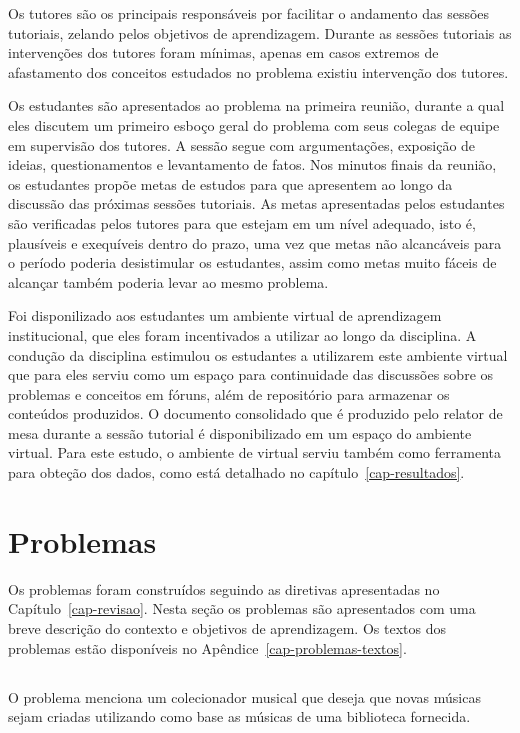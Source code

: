 Os tutores são os principais responsáveis por facilitar o andamento
das sessões tutoriais, zelando pelos objetivos de aprendizagem.
Durante as sessões tutoriais as intervenções dos tutores
foram mínimas, apenas em casos extremos de
afastamento dos conceitos estudados no problema existiu intervenção dos tutores.

Os estudantes são apresentados ao problema na primeira reunião, durante
a qual eles discutem um primeiro esboço geral do problema com seus
colegas de equipe em supervisão dos tutores.
A sessão segue com argumentações, exposição de ideias,
questionamentos e levantamento de fatos.
Nos minutos finais da reunião, os estudantes propõe metas de estudos para
que apresentem ao longo da discussão das próximas sessões tutoriais.
As metas apresentadas pelos estudantes são verificadas pelos tutores
para que estejam em um nível adequado, isto é, plausíveis e exequíveis
dentro do prazo, uma vez que metas não
alcancáveis para o período poderia desistimular os estudantes, assim
como metas muito fáceis de alcançar também poderia levar
ao mesmo problema.

Foi disponilizado aos estudantes um ambiente virtual de aprendizagem
institucional, que eles foram incentivados a utilizar ao longo
da disciplina.
A condução da disciplina estimulou os estudantes a
utilizarem este ambiente virtual que para eles serviu como um
espaço para continuidade das discussões sobre os problemas
e conceitos em fóruns, além de repositório para armazenar
os conteúdos produzidos.
O documento consolidado que é produzido pelo relator de mesa
durante a sessão tutorial é disponibilizado em um espaço
do ambiente virtual.
Para este estudo, o ambiente de virtual serviu
também como ferramenta para obteção dos dados,
como está detalhado no
capítulo~\ref{cap-resultados}.

\section{Problemas}
Os problemas foram construídos seguindo as diretivas
apresentadas no Capítulo~\ref{cap-revisao}.
Nesta seção os problemas são apresentados com uma breve
descrição do contexto e objetivos de aprendizagem.
Os textos dos problemas estão disponíveis no
Apêndice~\ref{cap-problemas-textos}.

\subsection{\ProblemaA}
O problema menciona um colecionador musical que deseja que
novas músicas sejam criadas utilizando como base as músicas
de uma biblioteca fornecida.

